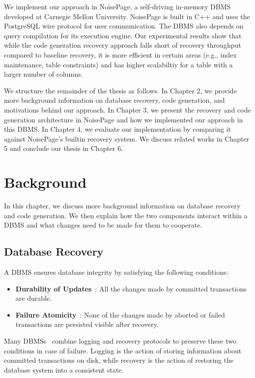 \documentclass[12pt]{cmuthesis}
\begin{document}
We implement our approach in NoisePage\cite{noisepage}, a self-driving in-memory DBMS developed at Carnegie Mellon University. NoisePage is built in C++ and uses the PostgreSQL wire protocol for user communication. The DBMS also depends on query compilation for its execution engine. Our experimental results show that while the code generation recovery approach falls short of recovery throughput compared to baseline recovery, it is more efficient in certain areas (e.g., index maintenance, table constraints) and has higher scalabiltiy for a table with a larger number of columns.

We structure the remainder of the thesis as follows. In Chapter 2, we provide more background information on database recovery, code generation, and motivations behind our approach. In Chapter 3, we present the recovery and code generation architecture in NoisePage and how we implemented our approach in this DBMS. In Chapter 4, we evaluate our implementation by comparing it against NoisePage's builtin recovery system. We discuss related works in Chapter 5 and conclude our thesis in Chapter 6.

\chapter{Background}
In this chapter, we discuss more background information on database recovery and code generation. We then explain how the two components interact within a DBMS and what changes need to be made for them to cooperate.

\section{Database Recovery}
A DBMS ensures database integrity by satisfying the following conditions:
\begin{itemize}
    \item \textbf{Durability of Updates}~\cite{agrawal89}: All the changes made by committed transactions are durable.
    \item \textbf{Failure Atomicity}~\cite{franklin97}: None of the changes made by aborted or failed transactions are persisted visible after recovery.
\end{itemize}

Many DBMSs~\cite{noisepage, malviya14, hekaton2013, silo_r, azure, postgres, mysql} combine logging and recovery protocols to preserve these two conditions in case of failure. Logging is the action of storing information about committed transactions on disk, while recovery is the action of restoring the database system into a consistent state.
\end{document}
